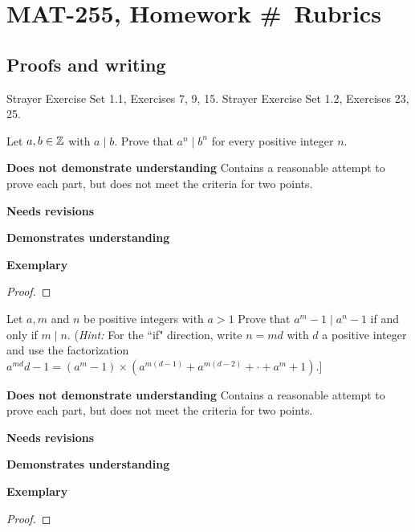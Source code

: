 \documentclass[letterpaper, 11pt]{../ximera}
\begin{document}
\chapter{MAT-255, Homework \#\homework\ Rubrics}

\section*{Proofs and writing}  %
Strayer Exercise Set 1.1, Exercises 7, 9, 15. Strayer Exercise Set 1.2, Exercises 23, 25. 
\begin{ex}
 Let $a, b \in\mathbb Z$ with $a\mid b$. Prove that $a^n\mid b^n$ for every positive integer $n$.
\end{ex}

\begin{writeRubric}
    \item \textbf{Does not demonstrate understanding}
     Contains a reasonable attempt to prove each part, but does not meet the criteria for two points.
    \item \textbf{Needs revisions}
     
    \item \textbf{Demonstrates understanding}
    
    \item \textbf{Exemplary}
        
\end{writeRubric}
                                       \begin{proof}
 
\end{proof}

\begin{ex}
 Let $a, m$ and $n$ be positive integers with $a >1$ Prove that $a^m-1\mid a^n-1$ if and only if $m\mid n.$ (\emph{Hint:} For the ``if" direction, write $n= md$ with $d$ a positive integer and use the factorization $a^{md} d - 1= (a^m - 1) \times  (a^{m(d-1)} + a^{m(d-2)} +\cdot + a^m + 1).$]
\end{ex}

\begin{writeRubric}
    \item \textbf{Does not demonstrate understanding}
     Contains a reasonable attempt to prove each part, but does not meet the criteria for two points.
    \item \textbf{Needs revisions}
     
    \item \textbf{Demonstrates understanding}
    
    \item \textbf{Exemplary}
        
\end{writeRubric}
                                       \begin{proof}
 
\end{proof}
\end{document}
